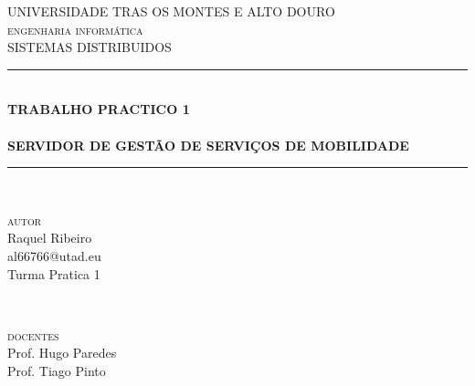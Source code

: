 \documentclass[12pt]{article}
\author{dxcccii}
\begin{document}

\begin{titlepage} %
	\newcommand{\HRule}{\rule{\linewidth}{0.5mm}} %
	
	\center %
	
	
	\textsc{\LARGE UNIVERSIDADE TRAS OS MONTES E ALTO DOURO}\\[1.5cm] %
	
	\textsc{\Large engenharia informática}\\[0.5cm] %
	
	\textsc{\large SISTEMAS DISTRIBUIDOS}\\[0.5cm] %
	
	
	\HRule\\[0.4cm]
	
	{\huge\bfseries TRABALHO PRACTICO 1\\ 
	\hfill \\
	SERVIDOR DE GESTÃO DE SERVIÇOS DE MOBILIDADE}\\[0.4cm] %
	
	\HRule\\[1.5cm]
	
	
	\begin{minipage}{0.4\textwidth}
		\begin{flushleft}
			{\Large
			\textsc{autor}}\\
			 {\large Raquel Ribeiro\\ al66766@utad.eu\\Turma Pratica 1} %
		\end{flushleft}
	\end{minipage}
	~
	\begin{minipage}{0.4\textwidth}
		\begin{flushright}
			\Large
			\textsc{docentes}\\
			{\large Prof. Hugo Paredes\\ Prof. Tiago Pinto }
		\end{flushright}
	\end{minipage}


\end{titlepage}
\end{document}
